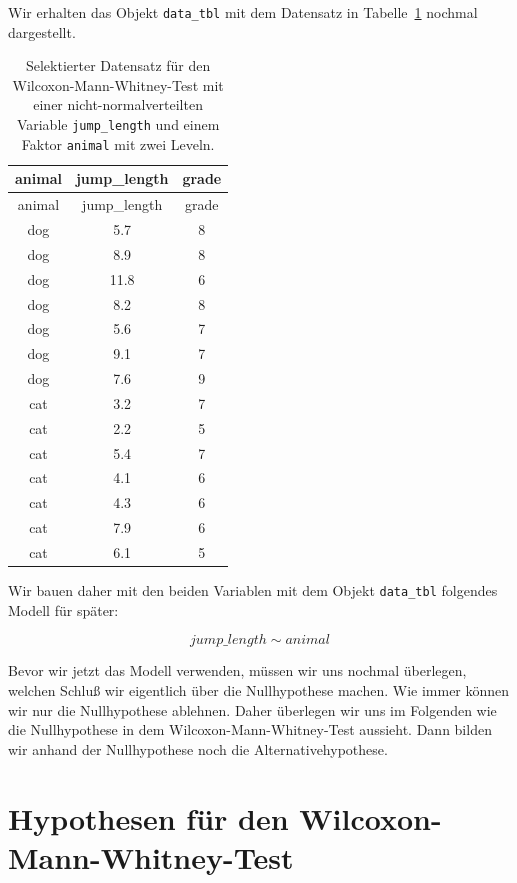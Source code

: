 \documentclass[
  letterpaper,
  DIV=11,
  oneside]{scrreport}
\begin{document}
Wir erhalten das Objekt \texttt{data\_tbl} mit dem Datensatz in
Tabelle~\ref{tbl-data-utest-1} nochmal dargestellt.

\hypertarget{tbl-data-utest-1}{}
\begin{longtable}[]{@{}ccc@{}}
\caption{\label{tbl-data-utest-1}Selektierter Datensatz für den
Wilcoxon-Mann-Whitney-Test mit einer nicht-normalverteilten Variable
\texttt{jump\_length} und einem Faktor \texttt{animal} mit zwei
Leveln.}\tabularnewline
\toprule()
animal & jump\_length & grade \\
\midrule()
\endfirsthead
\toprule()
animal & jump\_length & grade \\
\midrule()
\endhead
dog & 5.7 & 8 \\
dog & 8.9 & 8 \\
dog & 11.8 & 6 \\
dog & 8.2 & 8 \\
dog & 5.6 & 7 \\
dog & 9.1 & 7 \\
dog & 7.6 & 9 \\
cat & 3.2 & 7 \\
cat & 2.2 & 5 \\
cat & 5.4 & 7 \\
cat & 4.1 & 6 \\
cat & 4.3 & 6 \\
cat & 7.9 & 6 \\
cat & 6.1 & 5 \\
\bottomrule()
\end{longtable}

Wir bauen daher mit den beiden Variablen mit dem Objekt
\texttt{data\_tbl} folgendes Modell für später:

\[
jump\_length \sim animal
\]

Bevor wir jetzt das Modell verwenden, müssen wir uns nochmal überlegen,
welchen Schluß wir eigentlich über die Nullhypothese machen. Wie immer
können wir nur die Nullhypothese ablehnen. Daher überlegen wir uns im
Folgenden wie die Nullhypothese in dem Wilcoxon-Mann-Whitney-Test
aussieht. Dann bilden wir anhand der Nullhypothese noch die
Alternativehypothese.

\hypertarget{hypothesen-fuxfcr-den-wilcoxon-mann-whitney-test}{%
\section{Hypothesen für den
Wilcoxon-Mann-Whitney-Test}\label{hypothesen-fuxfcr-den-wilcoxon-mann-whitney-test}}
\end{document}
